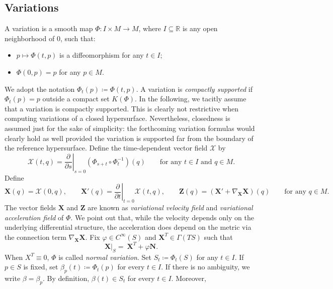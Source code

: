 \documentclass[11pt]{amsart}
\newcommand{\n}[1]{\nabla^\varepsilon_{ #1 }}
\newcommand{\rr}{{\mathbb{R}}}
\newcommand{\Y}{\mathcal X}
\newcommand{\X}{\mathbf{X}}
\newcommand{\Z}{\mathbf{Z}}
\renewcommand{\n}{\mathbf{N}}
\theoremstyle{definition}
\theoremstyle{remark}
\numberwithin{equation}{section}
\begin{document}
  \subsection{Variations}\label{subsec_variations}
    A variation is a smooth map $\Phi:I\times M\to M$, where $I\subseteq\rr$ is any open neighborhood of $0$, such that:
\begin{itemize}
    \item $p\mapsto \Phi(t,p)$ is a diffeomorphism for any $t\in I$;
    \item $\Phi(0,p)=p$ for any $p\in M$. 
\end{itemize}
We adopt the notation $\Phi_t(p)\coloneqq\Phi(t,p)$. A variation is \emph{compactly supported} if $\Phi_t(p)=p$ outside a compact set $K(\Phi)$. In the following, we tacitly assume that a variation is compactly supported. This is clearly not restrictive when computing variations of a closed hypersurface. Nevertheless, closedness is assumed just for the sake of simplicity: the forthcoming variation formulas would clearly hold as well provided the variation is supported far from the boundary of the reference hypersurface. Define the time-dependent vector field $\Y$ by
\begin{equation}\label{def_xechis}
    \Y(t,q)=\left.\frac{\partial}{\partial s}\right|_{s=0}\left(\Phi_{s+t}\circ\Phi_t^{-1}\right)(q)\qquad\text{for any $t\in I$ and $q\in M$.}
\end{equation}
Define
\begin{equation*}
    \X(q)=\Y(0,q),\qquad \X'(q)=\left.\frac{\partial }{\partial t}\right|_{t=0}\Y(t,q),\qquad\Z(q)=\left(\X'+\nabla_\X\X\right)(q)\qquad\text{for any $q\in M$.}
\end{equation*}
The vector fields $\X$ and $\Z$ are known as \emph{variational velocity field} and \emph{variational acceleration field} of $\Phi$. We point out that, while the velocity depends only on the underlying differential structure, the acceleration does depend on the metric via the connection term $\nabla_\X\X$. 
Fix $\varphi\in C^\infty(S)$ and $ \X^T\in\Gamma(TS)$ such that 
\begin{equation*}
    \X|_S=\ \X^T+\varphi \n.
\end{equation*}
When $X^T\equiv 0$, $\Phi$ is called \emph{normal variation}. 
     Set $S_t\coloneqq \Phi_t(S)$ for any $t\in I.$ If $p\in S$ is fixed, set $\beta_p(t)\coloneqq \Phi_t(p)$ for every $t\in I$. If there is no ambiguity, we write $\beta=\beta_p$. By definition, $\beta(t)\in S_t$ for every $t\in I$. Moreover,
\end{document}
